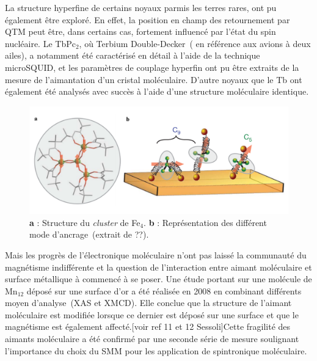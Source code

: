 La structure hyperfine de certains noyaux parmis les terres rares, ont pu également être exploré. En effet, la position en champ des retournement par QTM peut être, dans certains cas, fortement influencé par l'état du spin nucléaire. Le TbPc$_{2}$, où Terbium Double-Decker~( en référence aux avions à deux ailes), a notamment été caractérisé en détail à l'aide de la technique microSQUID, et les paramètres de couplage hyperfin ont pu être extraits de la mesure de l'aimantation d'un cristal moléculaire. D'autre noyaux que le Tb ont également été analysés avec succès à l'aide d'une structure moléculaire identique.

\begin{figure}
\centering \includegraphics[scale=0.45]{Spintronique/MolecularMag2/MolecularMag2.pdf}
\caption{\textbf{a} : Structure du \textit{cluster} de Fe$_4$. \textbf{b} : Représentation des différent mode d'ancrage~(extrait de ??).}
\label{MolecularMag2}
\end{figure}

Mais les progrès de l'électronique moléculaire n'ont pas laissé la communauté du magnétisme indifférente et la question de l'interaction entre aimant moléculaire et surface métallique à commencé à se poser. Une étude portant sur une molécule de Mn$_{12}$ déposé sur une surface d'or a été réalisée en 2008 en combinant différents moyen d'analyse~(XAS et XMCD). Elle conclue que la structure de l'aimant moléculaire est modifiée lorsque ce dernier est déposé sur une surface et que le magnétisme est également affecté.[voir ref 11 et 12 Sessoli]Cette fragilité des aimants moléculaire a été confirmé par une seconde série de mesure soulignant l'importance du choix du SMM pour les application de spintronique moléculaire.


